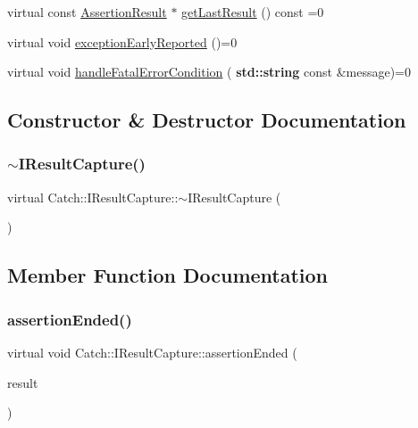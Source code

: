 \begin{DoxyCompactItemize}
\item 
virtual const \hyperlink{class_catch_1_1_assertion_result}{Assertion\+Result} $\ast$ \hyperlink{struct_catch_1_1_i_result_capture_ab18872c89fab97405a56e9c6a4919736}{get\+Last\+Result} () const =0
\item 
virtual void \hyperlink{struct_catch_1_1_i_result_capture_ae63ecec95db4c236c63ecf616f483810}{exception\+Early\+Reported} ()=0
\item 
virtual void \hyperlink{struct_catch_1_1_i_result_capture_a7d995222301e6605f26549726b30c3ee}{handle\+Fatal\+Error\+Condition} (\textbf{ std\+::string} const \&message)=0
\end{DoxyCompactItemize}


\subsection{Constructor \& Destructor Documentation}
\mbox{\label{struct_catch_1_1_i_result_capture_a3bd16719d6772b7470887fc36c6d0808}} 
\subsubsection{\texorpdfstring{$\sim$\+I\+Result\+Capture()}{~IResultCapture()}}
{\footnotesize\ttfamily virtual Catch\+::\+I\+Result\+Capture\+::$\sim$\+I\+Result\+Capture (\begin{DoxyParamCaption}{ }\end{DoxyParamCaption})\hspace{0.3cm}{\ttfamily [virtual]}}



\subsection{Member Function Documentation}
\mbox{\label{struct_catch_1_1_i_result_capture_ae45e08bccc5fb434656d4f2e44742223}} 
\subsubsection{\texorpdfstring{assertion\+Ended()}{assertionEnded()}}
{\footnotesize\ttfamily virtual void Catch\+::\+I\+Result\+Capture\+::assertion\+Ended (\begin{DoxyParamCaption}\item[{\hyperlink{class_catch_1_1_assertion_result}{Assertion\+Result} const \&}]{result }\end{DoxyParamCaption})\hspace{0.3cm}{\ttfamily [pure virtual]}}

